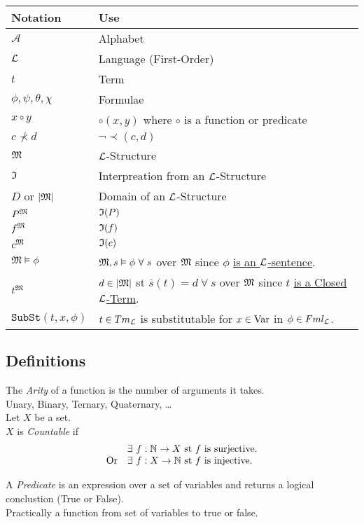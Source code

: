 \documentclass[11pt,a4paper]{article}
\begin{document}
\begin{center}\begin{tabular}{|l|l|}
\hline
\textbf{Notation}&\textbf{Use}\\
\hline$\mathcal{A}$&Alphabet\\
$\mathcal{L}$&Language (First-Order)\\
$t$&Term\\
$\phi,\psi,\theta,\chi$&Formulae\\
$x\circ y$&$\circ(x,y)$ where $\circ$ is a function or predicate\\
$c\not\prec d$&$\neg\prec(c,d)$\\
$\mathfrak{M}$&$\mathcal{L}$-Structure\\
$\mathfrak{I}$&Interpreation from an $\mathcal{L}$-Structure\\
$D$ or $|\mathfrak{M}|$&Domain of an $\mathcal{L}$-Structure\\
$P^{\mathfrak{M}}$&$\mathfrak{I}(P)$\\
$f^{\mathfrak{M}}$&$\mathfrak{I}(f)$\\
$c^{\mathfrak{M}}$&$\mathfrak{I}(c)$\\
$\mathfrak{M}\vDash\phi$&$\M,s\vDash\phi\ \forall\ s$ over $\mathfrak{M}$ since $\phi$ \underline{is an $\mathcal{L}$-sentence}.\\
$t^{\mathfrak{M}}$&$d\in|\mathfrak{M}|$ st $\bar{s}(t)=d\ \forall\ s$ over $\mathfrak{M}$ since $t$ \underline{is a Closed $\mathcal{L}$-Term}.\\
$\mathtt{SubSt}(t,x,\phi)$&$t\in Tm_{\mathcal{L}}$ is substitutable for $x\in\mathrm{Var}$ in $\phi\in Fml_{\mathcal{L}}$.\\
\hline
\end{tabular}\end{center}
 
\subsection{Definitions}

The \textit{Arity} of a function is the number of arguments it takes.\\
\nb Unary, Binary, Ternary, Quaternary, \dots\\

Let $X$ be a set.\\
$X$ is \textit{Countable} if
\[\begin{array}{rl}
&\exists\ f:\mathbb{N}\to X\text{ st }f\text{ is surjective}.\\
\text{Or}&\exists\ f:X\to\mathbb{N}\text{ st }f\text{ is injective}.
\end{array}\]

A \textit{Predicate} is an expression over a set of variables and returns a logical conclustion (\ie True or False).\\
\nb Practically a function from set of variables to true or false.
\end{document}
